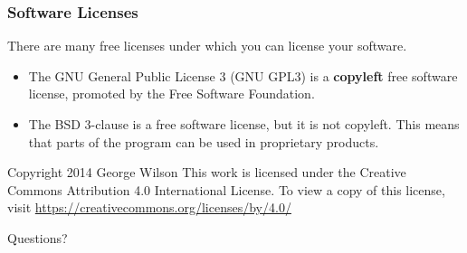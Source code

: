 \documentclass{beamer}
\begin{document}
\begin{frame}
\frametitle{Software Licenses}

There are many free licenses under which you can license your software.

\begin{itemize}
\item<+-> The GNU General Public License 3 (GNU GPL3) is a {\bf copyleft} 
  free software license, promoted by the Free Software Foundation.
\item<+-> The BSD 3-clause is a free software license, but it is not copyleft.
  This means that parts of the program can be used in proprietary products.
\end{itemize}

\end{frame}


\begin{frame}
Copyright 2014 George Wilson
This work is licensed under the Creative Commons Attribution 4.0 
International License. To view a copy of this license, visit 
\href{https://creativecommons.org/licenses/by/4.0/}{https://creativecommons.org/licenses/by/4.0/}
\end{frame}

\begin{frame}
\Huge{\centerline{Questions?}}
\end{frame}

\end{document}
